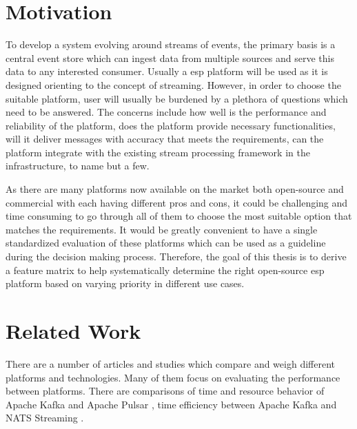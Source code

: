 \section{Motivation}
To develop a system evolving around streams of events, the primary basis is a central event store which can ingest data from multiple sources and serve this data to any interested consumer. Usually a \acrlong{esp} platform will be used as it is designed orienting to the concept of streaming. However, in order to choose the suitable platform, user will usually be burdened by a plethora of questions which need to be answered. The concerns include how well is the performance and reliability of the platform, does the platform provide necessary functionalities, will it deliver messages with accuracy that meets the requirements, can the platform integrate with the existing stream processing framework in the infrastructure, to name but a few.

As there are many platforms now available on the market both open-source and commercial with each having different pros and cons, it could be challenging and time consuming to go through all of them to choose the most suitable option that matches the requirements. It would be greatly convenient to have a single standardized evaluation of these platforms which can be used as a guideline during the decision making process. Therefore, the goal of this thesis is to derive a feature matrix to help systematically determine the right open-source \acrlong{esp} platform based on varying priority in different use cases. 


\section{Related Work}
There are a number of articles and studies which compare and weigh different platforms and technologies. Many of them focus on evaluating the performance between platforms. There are comparisons of time and resource behavior of Apache Kafka and Apache Pulsar \cite{intorruk2019comparative} \cite{benchmarkkafkapulsar}, time efficiency between Apache Kafka and NATS Streaming \cite{benchmarknatskafka}.

